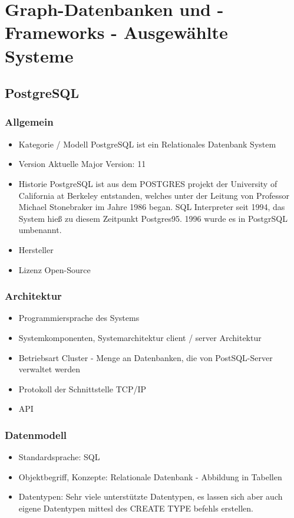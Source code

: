 \chapter{Graph-Datenbanken und -Frameworks - Ausgewählte Systeme }
\section{PostgreSQL}
\subsection{Allgemein}
    \begin{itemize}
        \item Kategorie / Modell
            \subitem PostgreSQL ist ein Relationales Datenbank System \cite{postgresqldoc}
        \item Version
            \subitem Aktuelle Major Version: 11
        \item Historie
            \subitem PostgreSQL ist aus dem POSTGRES projekt der University of California at Berkeley entstanden, welches unter der Leitung von  Professor Michael Stonebraker im Jahre 1986 began.
            SQL Interpreter seit 1994, das System hieß zu diesem Zeitpunkt Postgres95. 1996 wurde es in PostgrSQL umbenannt.\cite{postgresqldoc}
        \item Hersteller
        \item Lizenz
            \subitem Open-Source
    \end{itemize}
\subsection{Architektur}
    \begin{itemize}
        \item Programmiersprache des Systems
        \item Systemkomponenten, Systemarchitektur
        \subitem client / server Architektur \cite{postgresqldoc}
        \item Betriebsart
            \subitem Cluster - Menge an Datenbanken, die von PostSQL-Server verwaltet werden \cite{froehlich01}
        \item Protokoll der Schnittstelle
        \subitem TCP/IP
        \item API
    \end{itemize}

\subsection{Datenmodell}
    \begin{itemize}
        \item Standardsprache: SQL
        \item Objektbegriff, Konzepte: Relationale Datenbank - Abbildung in Tabellen
        \item Datentypen:
        \subitem Sehr viele unterstützte Datentypen, es lassen sich aber auch eigene Datentypen mittesl des CREATE TYPE befehls erstellen.\cite{postgres8}
    \end{itemize}
